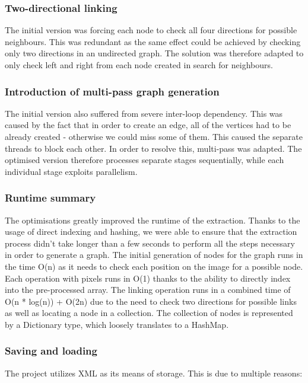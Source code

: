 \documentclass[12pt,a4paper]{report}
\begin{document}
\subsubsection{Two-directional linking}
	
The initial version was forcing each node to check all four directions for possible neighbours. This was redundant as the same effect could be achieved by checking only two directions in an undirected graph. The solution was therefore adapted to only check left and right from each node created in search for neighbours.

\subsubsection{Introduction of multi-pass graph generation}
The initial version also suffered from severe inter-loop dependency. This was caused by the fact that in order to create an edge, all of the vertices had to be already created - otherwise we could miss some of them. This caused the separate threads to block each other. In order to resolve this, multi-pass was adapted.  The optimised version therefore processes separate stages sequentially, while each individual stage exploits parallelism.

\subsubsection{Runtime summary}
The optimisations greatly improved the runtime of the extraction. Thanks to the usage of direct indexing and hashing, we were able to ensure that the extraction process didn't take longer than a few seconds to perform all the steps necessary in order to generate a graph. The initial generation of nodes for the graph runs in the time O(n) as it needs to check each position on the image for a possible node. Each operation with pixels runs in O(1) thanks to the ability to directly index into the pre-processed array. The linking operation runs in a combined time of O(n * log(n)) + O(2n) due to the need to check two directions for possible links as well as locating a node in a collection. The collection of nodes is represented by a Dictionary type, which loosely translates to a HashMap. 

\subsubsection{Saving and loading}
The project utilizes XML as its means of storage. This is due to multiple reasons:
	
\end{document}
